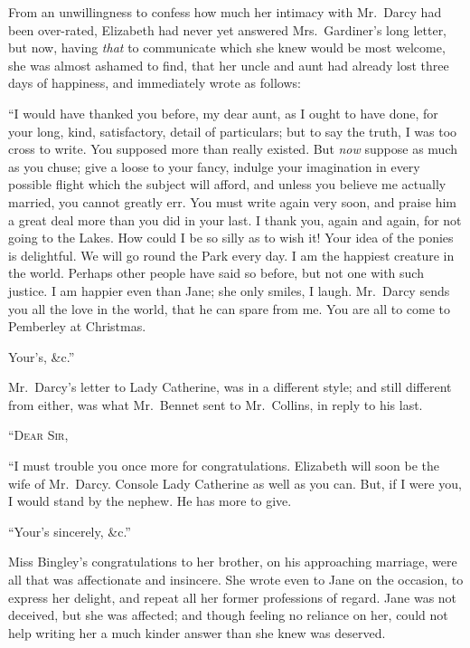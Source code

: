 From an unwillingness to confess how much her intimacy
with Mr.\ Darcy had been over-rated, Elizabeth had never
yet answered Mrs.\ Gardiner’s long letter, but now, having
\textit{that} to communicate which she knew would be most
welcome, she was almost ashamed to find, that her uncle
and aunt had already lost three days of happiness, and
immediately wrote as follows:

\begin{letter}
“I would have thanked you before, my dear aunt, as
I ought to have done, for your long, kind, satisfactory,
detail of particulars; but to say the truth, I was too
cross to write. You supposed more than really existed.
But \textit{now} suppose as much as you chuse; give a loose to
your fancy, indulge your imagination in every possible
flight which the subject will afford, and unless you believe
me actually married, you cannot greatly err. You must
write again very soon, and praise him a great deal more
than you did in your last. I thank you, again and again,
for not going to the Lakes. How could I be so silly as
to wish it! Your idea of the ponies is delightful. We
will go round the Park every day. I am the happiest
creature in the world. Perhaps other people have said
so before, but not one with such justice. I am happier
even than Jane; she only smiles, I laugh. Mr.\ Darcy
sends you all the love in the world, that he can spare from
me. You are all to come to Pemberley at Christmas.

\raggedleft Your’s, \&c.”
\end{letter}

Mr.\ Darcy’s letter to Lady Catherine, was in a different
style; and still different from either, was what Mr.\ Bennet
sent to Mr.\ Collins, in reply to his last.

\begin{letter}
“\textsc{Dear Sir},

“I must trouble you once more for congratulations.
Elizabeth will soon be the wife of Mr.\ Darcy. Console
Lady Catherine as well as you can. But, if I were you,
I would stand by the nephew. He has more to give.

\raggedleft “Your’s sincerely, \&c.”
\end{letter}

Miss Bingley’s congratulations to her brother, on his
approaching marriage, were all that was affectionate and
insincere. She wrote even to Jane on the occasion, to
express her delight, and repeat all her former professions
of regard. Jane was not deceived, but she was affected;
and though feeling no reliance on her, could not help
writing her a much kinder answer than she knew was
deserved.

